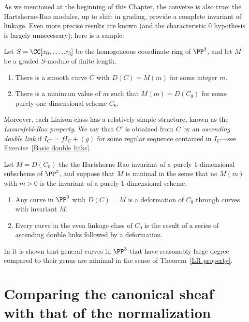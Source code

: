 As we mentioned at the beginning of this Chapter, the converse is also true: the Hartshorne-Rao modules, up to shift in grading, provide a complete invariant of
linkage. Even more precise results are known (and the characteristic 0 hypothesis is largely unnecessary); here is a sample:

\begin{fact}
\begin{theorem}
Let $S = \CC[x_0, \dots, x_3]$ be the homogeneous coordinate ring of $\PP^3$, and let $M$ be a graded $S$-module of finite length.
\begin{enumerate}
\item There is a smooth curve $C$ with $D(C) = M(m)$ for some integer $m$.
\item There is a minimum value of $m$ such that $M(m) = D(C_0)$ for some purely one-dimensional scheme $C_0$.
\end{enumerate}
\end{theorem}

Moreover, each Liaison class has a relatively simple structure, known as the \emph{Lazarsfeld-Rao property}.
We say that $C'$ is obtained from $C$ by an \emph{ascending double link} if $I_{C'} = fI_C+(g)$ for some regular sequence
contained in $I_C$---see Exercise~\ref{Basic double links}. 

\begin{theorem}\cite{MR1087803}\label{LR property}
Let $M = D(C_0)$ the the Hartshorne Rao invariant of a purely 1-dimensional subscheme of $\PP^3$, and suppose that
$M$ is minimal in the sense that no $M(m)$ with $m>0$ is the invariant of a purely 1-dimensional scheme. 
\begin{enumerate}
 \item Any curve in $\PP^3$ with $D(C) = M$ is a deformation of $C_{0}$ through curves with invariant $M$.
 \item Every curve in the even linkage class of $C_0$ is the result of a series of ascending double links followed by a deformation.
\end{enumerate}
\end{theorem}

In \cite{MR714753} it is shown that general curves  in $\PP^3$ that have 
reasonably large degree compared to their genus are minimal in the sense 
of  Theorem~\ref{LR property}.
\end{fact}

\section{Comparing the canonical sheaf with that of the normalization}

